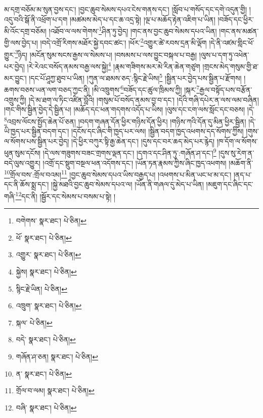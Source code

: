 མ་དགྲ་བཅོམ་མ་སུན་བྱས་དང་། །བྱང་ཆུབ་སེམས་དཔའ་ངེས་གནས་དང་། །སློབ་པ་གསོད་དང་དགེ་འདུན་གྱི། །འདུ་བའི་སྒོ་ནི་འཕྲོག་པ་དག །མཚམས་མེད་པ་དང་ཆ་འདྲ་སྟེ། །ལྔ་པ་མཆོད་རྟེན་འཇིག་པ་ཡིན། །བཟོད་དང་ཕྱིར་མི་འོང་དགྲ་བཅོམ། །འཐོབ་ལ་ལས་གེགས་\footnote{བགེགས་  སྣར་ཐང་།  པེ་ཅིན། }ཤིན་ཏུ་བྱེད། །གང་ནས་བྱང་ཆུབ་སེམས་དཔའ་ཡིན། །གང་ནས་མཚན་གྱི་ལས་བྱེད་པ། །བདེ་འགྲོ་རིགས་མཐོར་སྐྱེ་དབང་ཚང་། །ཕོར་\footnote{ཕོ་  སྣར་ཐང་།  པེ་ཅིན། }འགྱུར་ཚེ་རབས་དྲན་མི་ལྡོག །དེ་ནི་འཛམ་གླིང་ཕོ་གྱུར་\footnote{འགྱུར་  སྣར་ཐང་།  པེ་ཅིན། }ཉིད། །མངོན་སུམ་སངས་རྒྱས་ལ་སེམས་པ། །བསམས་པ་ལས་བྱུང་བསྐལ་པ་བརྒྱ། །ལུས་པ་དག་ཏུ་འཕེན་པར་བྱེད། །རེ་རེའང་བསོད་ནམས་བརྒྱ་ལས་སྐྱེ།\footnote{སྐྱེས།  སྣར་ཐང་།  པེ་ཅིན། } །རྣམ་གཟིགས་མར་མེ་རིན་ཆེན་གཙུག །གྲངས་མེད་གསུམ་གྱི་ཐ་མར་བྱུང་། །དང་པོ་ཤཱཀྱ་ཐུབ་པ་ཡིན། །ཀུན་ལ་ཐམས་ཅད་:སྙིང་རྗེ་ཡིས།\footnote{སྙིང་རྗེ་ཡིན།  པེ་ཅིན། } །སྦྱིན་པར་བྱེད་པས་སྦྱིན་པ་རྫོགས། །ཆགས་བཅས་ཡན་ལག་བཅད་ཀྱང་ནི། །མི་འཁྲུགས་\footnote{འཁྲུག་  སྣར་ཐང་།  པེ་ཅིན། }བཟོད་དང་ཚུལ་ཁྲིམས་ཀྱི། །སྐར་\footnote{སྐལ་  པེ་ཅིན། }རྒྱལ་བསྟོད་པས་བརྩོན་འགྲུས་ཀྱི། །དེ་མ་ཐག་ལ་ཏིང་འཛིན་བློའི། །གསུམ་པོ་བསོད་ནམས་བྱ་བ་དང་། །དེའི་གཞི་དཔེར་ན་ལས་ལམ་བཞིན། །གང་གིས་སྦྱིན་བྱེད་དེ་སྦྱིན་པ། །མཆོད་དང་ཕན་གདགས་འདོད་པ་ཡིས། །ལུས་དང་ངག་ལས་སློང་དང་བཅས། །དེ་\footnote{བདེ་  སྣར་ཐང་།  པེ་ཅིན། }འབྲས་ལོངས་སྤྱོད་ཆེན་པོ་ཅན། །བདག་གཞན་དོན་ཕྱིར་གཉིས་དོན་ཕྱིར། །གཉིས་ཀའི་དོན་དུ་མིན་ཕྱིར་སྦྱིན། །དེ་ཡི་ཁྱད་པར་སྦྱིན་བདག་དང་། །དངོས་དང་ཞིང་གི་ཁྱད་པར་ལས། །སྦྱིན་བདག་ཁྱད་འཕགས་དད་སོགས་ཀྱིས། །གུས་ལ་སོགས་པས་སྦྱིན་པར་བྱེད། །དེ་ཕྱིར་བཀུར་སྟི་རྒྱ་ཆེན་དང་། །དུས་དང་བར་ཆད་མེད་པར་རྙེད། །ཁ་དོག་ལ་སོགས་ཕུན་སུམ་དངོས། །དེ་ལས་གཟུགས་བཟང་གྲགས་ལྡན་དང་། །དགའ་དང་ཤིན་ཏུ་:གཞོན་ཤ་དང་།\footnote{གཞོན་ཤ་ཅན།  སྣར་ཐང་།  པེ་ཅིན། } །དུས་སུ་རེག་ན་བདེ་ལུས་འགྱུར། །འགྲོ་དང་སྡུག་བསྔལ་ཕན་འདོགས་དང་། །ཡོན་ཏན་རྣམས་ཀྱིས་ཞིང་ཁྱད་འཕགས། །མཆོག་ནི་\footnote{ན་  སྣར་ཐང་།  པེ་ཅིན། }གྲོལ་བས་:གྲོལ་བའམ།\footnote{གྲོལ་བ་ལམ།  སྣར་ཐང་།  པེ་ཅིན། } །བྱང་ཆུབ་སེམས་དཔའ་ཡིས་བརྒྱད་པ། །འཕགས་པ་མིན་ཡང་ཕ་མ་དང་། །ནད་པ་དང་ནི་ཆོས་སྨྲ་དང་། །སྐྱེ་མཐའི་བྱང་ཆུབ་སེམས་དཔའ་ལ། །ཡོན་ནི་གཞལ་དུ་མེད་པ་ཡིན། །མཇུག་དང་ཞིང་དང་གཞི་\footnote{བཞི་  སྣར་ཐང་།  པེ་ཅིན། }དང་ནི། །སྦྱོར་དང་སེམས་པ་བསམ་པ་སྟེ། །
